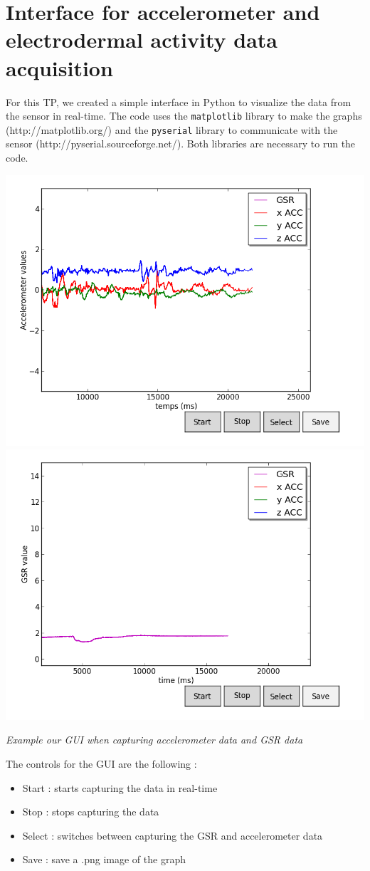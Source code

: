 \documentclass[12pt,a4paper]{article}
\begin{document}
\clearpage
\section{Interface for accelerometer and electrodermal activity 
 data acquisition}

For this TP, we created a simple interface in Python to visualize the data from the sensor in real-time. The code uses the \texttt{matplotlib} library to make the graphs (http://matplotlib.org/) and the \texttt{pyserial} library to communicate with the sensor (http://pyserial.sourceforge.net/). Both libraries are necessary to run the code. 

\begin{center}
\includegraphics[scale=0.3]{figSav_ACC.png}
\includegraphics[scale=0.3]{figSav_GSR.png}

\textit{Example our GUI when capturing accelerometer data and GSR data}
\end{center}

The controls for the GUI are the following :
\begin{itemize}
  \item Start : starts capturing the data in real-time
  \item Stop : stops capturing the data
  \item Select : switches between capturing the GSR and accelerometer data
	\item Save : save a .png image of the graph
\end{itemize}
\end{document}
